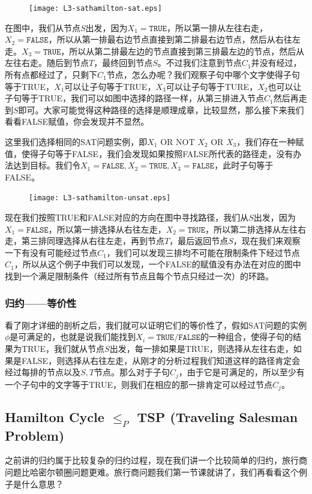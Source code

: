 \begin{figure}[H]
\centering
 \texttt{[image: L3-sathamilton-sat.eps]}
\end{figure}

在图中，我们从节点$S$出发，因为$X_1 = \texttt{TRUE}$，所以第一排从左往右走，$X_2 = \texttt{FALSE}$，所以从第一排最右边节点直接到第二排最右边节点，然后从右往左走。$X_3 = \texttt{TRUE}$，所以从第二排最左边的节点直接到第三排最左边的节点，然后从左往右走。随后到节点$T$，最终回到节点$S$。不过我们注意到节点$C_1$并没有经过，所有点都经过了，只剩下$C_1$节点，怎么办呢？我们观察子句中哪个文字使得子句等于TRUE，$X_1$可以让子句等于TRUE，$X_3$可以让子句等于TURE，$X_2$也可以让子句等于TRUE，我们可以如图中选择的路径一样，从第三排进入节点$C_1$然后再走到$S$即可。大家可能觉得这种路径的选择是顺理成章，比较显然，那么接下来我们看看FALSE赋值，你会发现并不显然。

这里我们选择相同的SAT问题实例，即$X_1$ OR NOT $X_2$ OR $X_3$，我们存在一种赋值，使得子句等于FALSE，我们会发现如果按照FALSE所代表的路径走，没有办法达到目标。我们令$X_1 = \texttt{FALSE}, X_2 = \texttt{TRUE}, X_3 = \texttt{FALSE}$，此时子句等于FALSE。

\begin{figure}[H]
\centering
 \texttt{[image: L3-sathamilton-unsat.eps]}
\end{figure}

现在我们按照TRUE和FALSE对应的方向在图中寻找路径，我们从$S$出发，因为$X_1 = \texttt{FALSE}$，所以第一排选择从右往左走，$X_2 = \texttt{TRUE}$，所以第二排选择从左往右走，第三排同理选择从右往左走，再到节点$T$，最后返回节点$S$，现在我们来观察一下有没有可能经过节点$C_1$，我们可以发现三排均不可能在限制条件下经过节点$C_1$，所以从这个例子中我们可以发现，一个FALSE的赋值没有办法在对应的图中找到一个满足限制条件（经过所有节点且每个节点只经过一次）的环路。

\subsubsection{归约——等价性}

看了刚才详细的剖析之后，我们就可以证明它们的等价性了，假如SAT问题的实例$\phi$是可满足的，也就是说我们能找到$X_i = \texttt{TRUE/FALSE}$的一种组合，使得子句的结果为TRUE，我们就从节点$S$出发，每一排如果是TRUE，则选择从左往右走，如果是FALSE，则选择从右往左走，从刚才的分析过程我们知道这样的路径肯定会经过每排的节点以及$S,T$节点。那么对于子句$C_j$，由于它是可满足的，所以至少有一个子句中的文字等于TRUE，则我们在相应的那一排肯定可以经过节点$C_j$。

\subsection{{\sc Hamilton Cycle} $\le_P$ {\sc TSP (Traveling Salesman Problem) }}
之前讲的归约属于比较复杂的归约过程，现在我们讲一个比较简单的归约，旅行商问题比哈密尔顿圈问题更难。旅行商问题我们第一节课就讲了，我们再看看这个例子是什么意思？

